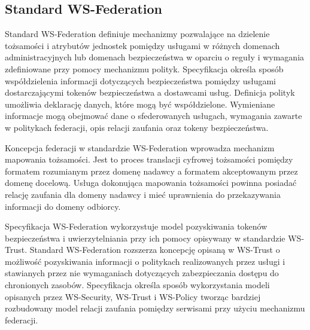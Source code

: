 	\subsection{Standard WS-Federation}

		Standard WS-Federation definiuje mechanizmy pozwalające na dzielenie tożsamości i atrybutów jednostek pomiędzy usługami w różnych domenach administracyjnych lub domenach bezpieczeństwa w oparciu o reguły i wymagania zdefiniowane przy pomocy mechanizmu polityk\cite{Goodner09}. Specyfikacja określa sposób współdzielenia informacji dotyczących bezpieczeństwa pomiędzy usługami dostarczającymi tokenów bezpieczeństwa a dostawcami usług. Definicja polityk umożliwia deklarację danych, które mogą być współdzielone. Wymieniane informacje mogą obejmować dane o sfederowanych usługach, wymagania zawarte w politykach federacji, opis relacji zaufania oraz tokeny bezpieczeństwa.

		Koncepcja federacji w standardzie WS-Federation wprowadza mechanizm mapowania tożsamości. Jest to proces translacji cyfrowej tożsamości pomiędzy formatem rozumianym przez domenę nadawcy a formatem akceptowanym przez domenę docelową. Usługa dokonująca mapowania tożsamości powinna posiadać relację zaufania dla domeny nadawcy i mieć uprawnienia do przekazywania informacji do domeny odbiorcy.

		Specyfikacja WS-Federation wykorzystuje model pozyskiwania tokenów bezpieczeństwa i uwierzytelniania przy ich pomocy opisywany w standardzie WS-Trust. Standard WS-Federation rozszerza koncepcję opisaną w WS-Trust o możliwość pozyskiwania informacji o politykach realizowanych przez usługi i stawianych przez nie wymaganiach dotyczących zabezpieczania dostępu do chronionych zasobów. Specyfikacja określa sposób wykorzystania modeli opisanych przez WS-Security, WS-Trust i WS-Policy tworząc bardziej rozbudowany model relacji zaufania pomiędzy serwisami przy użyciu mechanizmu federacji.

